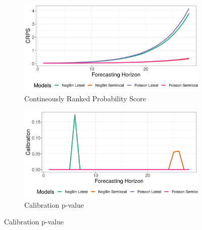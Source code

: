 \begin{figure}[H]
\begin{subfigure}{0.5\textwidth}
  \centering
  \includegraphics[width=\linewidth]{../output/Rwampara_crps.png}  
  \caption{Contineously Ranked Probability Score}
  \label{Rwampara_scores_1}
\end{subfigure}
\begin{subfigure}{0.5\textwidth}
  \centering
  \includegraphics[width=\linewidth]{../output/Rwampara_calibration.png}  
  \caption{Calibration p-value}
  \label{Rwampara_scores_2}
\end{subfigure}


\end{figure}
